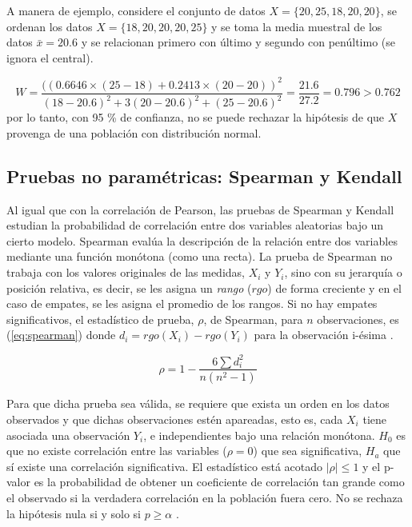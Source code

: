 \documentclass[12pt, letter paper]{report}
\begin{document}
        A manera de ejemplo, considere el conjunto de datos $X = \{20, 25, 18,
        20, 20\}$, se ordenan los datos $X = \{18, 20, 20, 20, 25\}$ y se toma
        la media muestral de los datos $\bar{x} = \num{20,6}$ y se relacionan
        primero con último y segundo con penúltimo (se ignora el central).

        $$W = \frac{
          ((\num{0,6646} \times (25 - 18) + \num{0,2413} \times (20 - 20))^2
        }{
          (18 - \num{20,6})^2 + 3(20 - \num{20,6})^2 + (25 - \num{20,6})^2
        } = \frac{\num{21,6}}{\num{27,2}} = \num{0,796} > \num{0,762}$$ 
        por lo tanto, con 95 \% de confianza, no se puede rechazar la hipótesis
        de que $X$ provenga de una población con distribución normal.

      \subsection{Pruebas no paramétricas: Spearman y Kendall} %
      \label{sub:pruebas_no_paramétricas_spearman_y_kendall}
        Al igual que con la correlación de Pearson, las pruebas de Spearman y
        Kendall estudian la probabilidad de correlación entre dos variables
        aleatorias bajo un cierto modelo. Spearman evalúa la descripción de la
        relación entre dos variables mediante una función monótona (como una
        recta). La prueba de Spearman no trabaja con los valores originales de
        las medidas, $X_i$ y $Y_i$, sino con su jerarquía o posición relativa,
        es decir, se les asigna un \textit{rango} ($rgo$) de forma creciente y
        en el caso de empates, se les asigna el promedio de los rangos. Si no
        hay empates significativos, el estadístico de prueba, $\rho$, de
        Spearman, para $n$ observaciones, es (\ref{eq:spearman}) donde $d_i =
        rgo(X_i) - rgo(Y_i)$ para la observación i-ésima
        \cite{spearman1904proof}.

        \begin{equation}
          \rho = 1 - \dfrac{6 \sum d_i^2}{n(n^2-1)}
          \label{eq:spearman}
        \end{equation}

        Para que dicha prueba sea válida, se requiere que exista un orden en
        los datos observados y que dichas observaciones estén apareadas, esto
        es, cada $X_i$ tiene asociada una observación $Y_i$, e independientes
        bajo una relación monótona. $H_0$ es que no existe correlación entre
        las variables ($\rho = 0$) que sea significativa, $H_a$ que sí existe
        una correlación significativa. El estadístico está acotado $|\rho| \le
        1$ y el p-valor es la probabilidad de obtener un coeficiente de
        correlación tan grande como el observado si la verdadera correlación
        en la población fuera cero. No se rechaza la hipótesis nula si y solo
        si $p \ge \alpha$ \cite{hotelling1936rank}.
\end{document}
